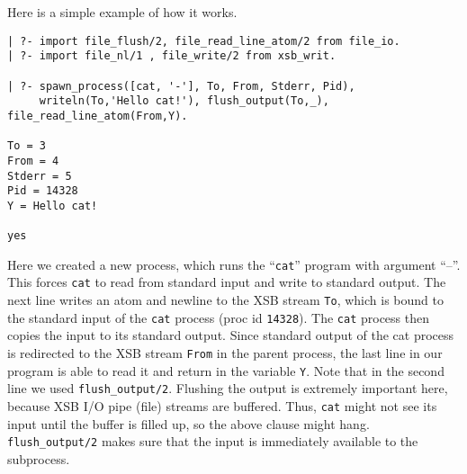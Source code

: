 \noindent
Here is a simple example of how it works.

\begin{verbatim}
| ?- import file_flush/2, file_read_line_atom/2 from file_io.
| ?- import file_nl/1 , file_write/2 from xsb_writ.  

| ?- spawn_process([cat, '-'], To, From, Stderr, Pid),
     writeln(To,'Hello cat!'), flush_output(To,_), file_read_line_atom(From,Y).

To = 3
From = 4
Stderr = 5
Pid = 14328
Y = Hello cat!

yes
\end{verbatim}

Here we created a new process, which runs the ``{\tt cat}'' program
with argument ``--''. This forces {\tt cat} to read from standard
input and write to standard output. The next line writes an atom and
newline to the XSB stream {\tt To}, which is bound to the standard
input of the {\tt cat} process (proc id {\tt 14328}). The {\tt cat}
process then copies the input to its standard output.  Since standard
output of the cat process is redirected to the XSB stream {\tt From}
in the parent process, the last line in our program is able to read it
and return in the variable {\tt Y}.
%
Note that in the second line we used {\tt flush\_output/2}. Flushing
the output is extremely important here, because XSB I/O pipe (file)
streams are buffered.  Thus, {\tt cat} might not see its input until
the buffer is filled up, so the above clause might hang. {\tt
flush\_output/2} makes sure that the input is immediately available to
the subprocess.

